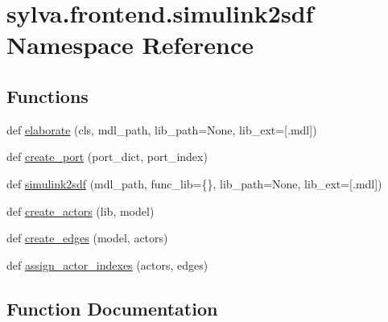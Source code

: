 \hypertarget{namespacesylva_1_1frontend_1_1simulink2sdf}{}\section{sylva.\+frontend.\+simulink2sdf Namespace Reference}
\label{namespacesylva_1_1frontend_1_1simulink2sdf}
\subsection*{Functions}
\begin{DoxyCompactItemize}
\item 
def \hyperlink{namespacesylva_1_1frontend_1_1simulink2sdf_a65e70cbcdade6118914d5c16f96ae56c}{elaborate} (cls, mdl\+\_\+path, lib\+\_\+path=None, lib\+\_\+ext=\mbox{[}\textquotesingle{}.mdl\textquotesingle{}\mbox{]})
\item 
def \hyperlink{namespacesylva_1_1frontend_1_1simulink2sdf_a86a92182288e89b6742e5124e8c3ec38}{create\+\_\+port} (port\+\_\+dict, port\+\_\+index)
\item 
def \hyperlink{namespacesylva_1_1frontend_1_1simulink2sdf_aa33a1cece85e239778cb65b5d4e62438}{simulink2sdf} (mdl\+\_\+path, func\+\_\+lib=\{\}, lib\+\_\+path=None, lib\+\_\+ext=\mbox{[}\textquotesingle{}.mdl\textquotesingle{}\mbox{]})
\item 
def \hyperlink{namespacesylva_1_1frontend_1_1simulink2sdf_a67a8c32527e5a89c1ec67fcd17a9da74}{create\+\_\+actors} (lib, model)
\item 
def \hyperlink{namespacesylva_1_1frontend_1_1simulink2sdf_a29bf2b8d871f7bcf95cd79761ad8cd85}{create\+\_\+edges} (model, actors)
\item 
def \hyperlink{namespacesylva_1_1frontend_1_1simulink2sdf_aa4a670a2c40a40dfb700426677bcb657}{assign\+\_\+actor\+\_\+indexes} (actors, edges)
\end{DoxyCompactItemize}


\subsection{Function Documentation}
\mbox{\label{namespacesylva_1_1frontend_1_1simulink2sdf_aa4a670a2c40a40dfb700426677bcb657}} 
